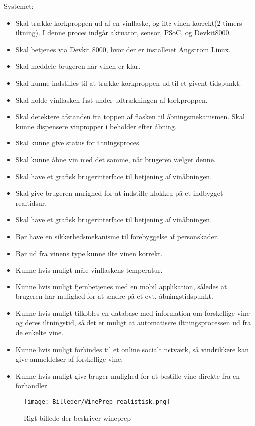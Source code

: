 Systemet: \begin{itemize}
	\item Skal trække korkproppen ud af en vinflaske, og ilte vinen korrekt(2 timers iltning). I denne proces indgår aktuator, sensor, PSoC, og Devkit8000.
	\item Skal betjenes via Devkit 8000, hvor der er installeret Angstrom Linux.
	\item Skal meddele brugeren når vinen er klar.
	\item Skal kunne indstilles til at trække korkproppen ud til et givent tidspunkt.
	\item Skal holde vinflasken fast under udtrækningen af korkproppen.
	\item Skal detektere afstanden fra toppen af flasken til åbningsmekanismen.
	Skal kunne dispensere vinpropper i beholder efter åbning.
	\item Skal kunne give status for iltningsproces.
	\item Skal kunne åbne vin med det samme, når brugeren vælger denne.
	\item Skal have et grafisk brugerinterface til betjening af vinåbningen.
	\item Skal give brugeren mulighed for at indstille klokken på et indbygget realtidsur.
	\item Skal have et grafisk brugerinterface til betjening af vinåbningen.
	\item Bør have en sikkerhedsmekanisme til forebyggelse af personskader.
	\item Bør ud fra vinens type kunne ilte vinen korrekt.
	\item Kunne hvis muligt måle vinflaskens temperatur.
	\item Kunne hvis muligt fjernbetjenes med en mobil applikation, således at brugeren har mulighed for at ændre på et evt. åbningstidspunkt.
	\item Kunne hvis muligt tilkobles en database med information om forskellige vine og deres iltningstid, så det er muligt at automatisere iltningsprocessen ud fra de enkelte vine.
	\item Kunne hvis muligt forbindes til et online socialt netværk, så vindrikkere kan give anmeldelser af forskellige vine.
	\item Kunne hvis muligt give bruger mulighed for at bestille vine direkte fra en forhandler.
\end{itemize}

\begin{figure}[H]
	\caption{Rigt billede der beskriver wineprep}
	\label{RIGTBILLEDE}
	\texttt{[image: Billeder/WinePrep\_realistisk.png]}
\end{figure}
